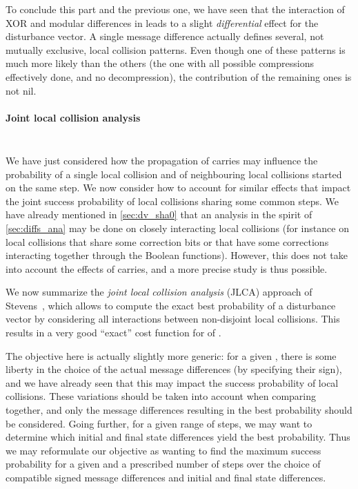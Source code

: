 \medskip

To conclude this part and the previous one, we have seen that the interaction of XOR and modular differences in \sha leads to a slight \emph{differential} effect for the disturbance vector. A single
message difference actually defines several, not mutually exclusive, local collision patterns. Even though one of these patterns is much more likely than the others (\ie the one with all possible compressions
effectively done, and no decompression), the contribution of the remaining ones is not nil.

\paragraph{Joint local collision analysis}
$\phantom{bouh}$

\medskip

\noindent
We have just considered how the propagation of carries may influence the probability of a single local collision and of neighbouring local collisions started on the same step. We now consider how to account for similar effects
that impact the joint success probability of local collisions sharing some common steps. We have already mentioned in \autoref{sec:dv_sha0} that an analysis in the spirit of \autoref{sec:diffs_ana} may be done
on closely interacting local collisions (for instance on local collisions that share some correction bits or that have some corrections interacting together through the Boolean functions).
However, this does not take into account the effects of carries, and a more precise study is thus
possible.

We now summarize the \emph{joint local collision analysis} (JLCA) approach of Stevens~\cite{phdstevens,DBLP:conf/eurocrypt/Stevens13}, which allows to compute the exact best probability of a disturbance vector
by considering all interactions between non-disjoint local collisions. This results in a very good ``exact'' cost function for \dvs of \shaone.

\medskip

The objective here is actually slightly more generic: for a given \dv, there is some liberty in the choice of the actual message differences (\eg by specifying their sign), and we have already seen that this
may impact the success probability of local collisions. These variations should be taken into account when comparing \dvs together, and only the message differences resulting in the best probability should
be considered. Going further, for a given range of steps, we may want to determine which initial and final state differences yield the best probability.
Thus we may reformulate our objective as wanting to find the maximum success probability for a given \dv and a prescribed number of steps over the choice of compatible signed message differences and initial
and final state differences.

